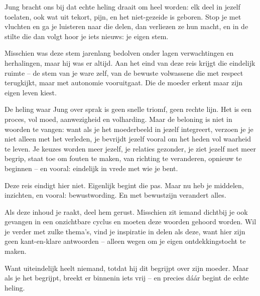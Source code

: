 Jung bracht ons bij dat echte heling draait om heel worden: elk deel in jezelf toelaten, ook wat uit tekort, pijn, en het niet-gezeide is geboren. Stop je met vluchten en ga je luisteren naar die delen, dan verliezen ze hun macht, en in de stilte die dan volgt hoor je iets nieuws: je eigen stem.

Misschien was deze stem jarenlang bedolven onder lagen verwachtingen en herhalingen, maar hij was er altijd. Aan het eind van deze reis krijgt die eindelijk ruimte – de stem van je ware zelf, van de bewuste volwassene die met respect terugkijkt, maar met autonomie vooruitgaat. Die de moeder erkent maar zijn eigen leven kiest.

De heling waar Jung over sprak is geen snelle triomf, geen rechte lijn. Het is een proces, vol moed, aanwezigheid en volharding. Maar de beloning is niet in woorden te vangen: want als je het moederbeeld in jezelf integreert, verzoen je je niet alleen met het verleden, je bevrijdt jezelf vooral om het heden vol waarheid te leven. Je keuzes worden meer jezelf, je relaties gezonder, je ziet jezelf met meer begrip, staat toe om fouten te maken, van richting te veranderen, opnieuw te beginnen – en vooral: eindelijk in vrede met wie je bent.

Deze reis eindigt hier niet. Eigenlijk begint die pas. Maar nu heb je middelen, inzichten, en vooral: bewustwording. En met bewustzijn verandert alles.

Als deze inhoud je raakt, deel hem gerust. Misschien zit iemand dichtbij je ook gevangen in een onzichtbare cyclus en moeten deze woorden gehoord worden. Wil je verder met zulke thema’s, vind je inspiratie in delen als deze, want hier zijn geen kant-en-klare antwoorden – alleen wegen om je eigen ontdekkingstocht te maken.

Want uiteindelijk heelt niemand, totdat hij dit begrijpt over zijn moeder. Maar als je het begrijpt, breekt er binnenin iets vrij – en precies dáár begint de echte heling.

